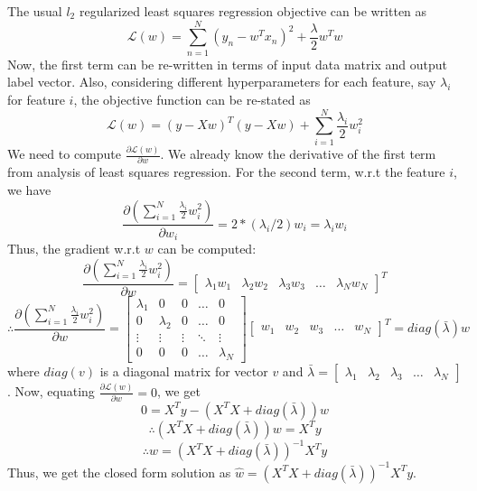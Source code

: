 \documentclass[a4paper,11pt]{article}
\begin{document}
\begin{mlsolution}

The usual $l_2$ regularized least squares regression objective can be written as 
\[
\mathcal{L}(w) = \sum_{n=1}^{N}(y_n - w^{T}x_n)^2 + \frac{\lambda}{2} w^{T}w 
\]
Now, the first term can be re-written in terms of input data matrix and output label vector. Also, considering different hyperparameters for each feature, say $\lambda_i$ for feature $i$, the objective function can be re-stated as
\[
\mathcal{L}(w) = (y - Xw)^{T}(y - Xw) + \sum_{i=1}^{N}\frac{\lambda_i}{2} w^{2}_{i} 
\]
We need to compute $\frac{\partial \mathcal{L}(w)}{\partial w}$. We already know the derivative of the first term from analysis of least squares regression. For the second term, w.r.t the feature $i$, we have
\[
\frac{\partial (\sum_{i=1}^{N}\frac{\lambda_i}{2} w^{2}_{i})}{\partial w_i} = 2*(\lambda_i/2)w_i = \lambda_i w_i 
\]
Thus, the gradient w.r.t $w$ can be computed:
\[
\frac{\partial (\sum_{i=1}^{N}\frac{\lambda_i}{2} w^{2}_{i})}{\partial w} = 
\begin{bmatrix}
\lambda_{1} w_1 & \lambda_{2}w_2 & \lambda_{3}w_3 & \dots  & \lambda_{N}w_N
\end{bmatrix}^{T}
\]
\[
\therefore \frac{\partial (\sum_{i=1}^{N}\frac{\lambda_i}{2} w^{2}_{i})}{\partial w} =
\begin{bmatrix}
\lambda_{1} & 0 & 0 & \dots  & 0 \\
0 & \lambda_{2} & 0 & \dots  & 0 \\
\vdots & \vdots & \vdots & \ddots & \vdots \\
0 & 0 & 0 & \dots  & \lambda_{N}
\end{bmatrix}
\begin{bmatrix}
w_1 & w_2 & w_3 & \dots  & w_N
\end{bmatrix}^{T} = diag(\bar{\lambda})w
\]
where $diag(v)$ is a diagonal matrix for vector $v$ and $\bar{\lambda} = \begin{bmatrix}
\lambda_{1} & \lambda_{2} & \lambda_{3} & \dots  & \lambda_{N}
\end{bmatrix}$. Now, equating $\frac{\partial \mathcal{L}(w)}{\partial w} = 0$, we get 
\[
0 = X^{T}y - (X^{T}X + diag(\bar{\lambda}))w
\]
\[
\therefore (X^{T}X + diag(\bar{\lambda}))w = X^{T}y 
\]
\[
\boxed{\therefore w = (X^{T}X + diag(\bar{\lambda}))^{-1}X^{T}y }
\]
Thus, we get the closed form solution as $\hat{w} = (X^{T}X + diag(\bar{\lambda}))^{-1}X^{T}y $.

\end{mlsolution}
\end{document}

